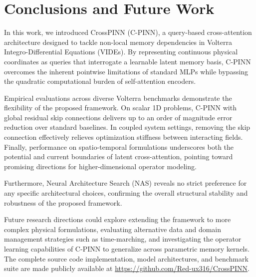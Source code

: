 
\section{Conclusions and Future Work}
\label{sec:conclusions}

In this work, we introduced CrossPINN (C-PINN), a query-based cross-attention architecture designed to tackle non-local memory dependencies in Volterra Integro-Differential Equations (VIDEs). By representing continuous physical coordinates as queries that interrogate a learnable latent memory basis, C-PINN overcomes the inherent pointwise limitations of standard MLPs while bypassing the quadratic computational burden of self-attention encoders.

Empirical evaluations across diverse Volterra benchmarks demonstrate the flexibility of the proposed framework. On scalar 1D problems, C-PINN with global residual skip connections delivers up to an order of magnitude error reduction over standard baselines. In coupled system settings, removing the skip connection effectively relieves optimization stiffness between interacting fields. Finally, performance on spatio-temporal formulations underscores both the potential and current boundaries of latent cross-attention, pointing toward promising directions for higher-dimensional operator modeling.

Furthermore, Neural Architecture Search (NAS) reveals no strict preference for any specific architectural choices, confirming the overall structural stability and robustness of the proposed framework.

Future research directions could explore extending the framework to more complex physical formulations, evaluating alternative data and domain management strategies such as time-marching, and investigating the operator learning capabilities of C-PINN to generalize across parametric memory kernels. The complete source code implementation, model architectures, and benchmark suite are made publicly available at \url{https://github.com/Red-ux316/CrossPINN}.

